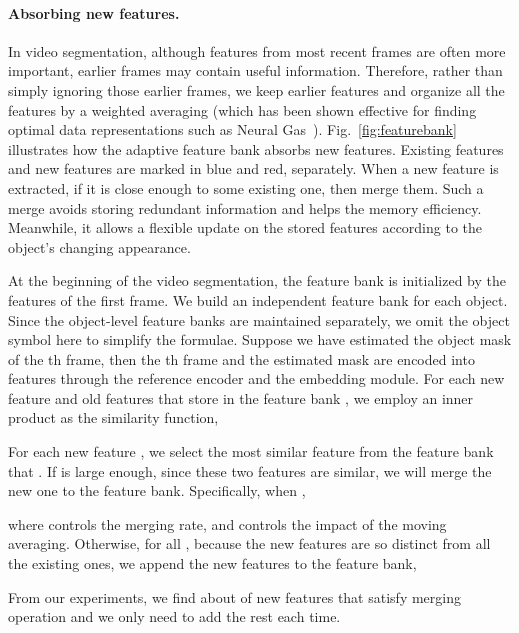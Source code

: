 \documentclass{article}
\begin{document}
\paragraph{Absorbing new features.}
In video segmentation, although features from most recent frames are often more important, earlier frames may contain useful information. 
Therefore, rather than simply ignoring those earlier frames, we keep earlier features and organize all the features by a weighted averaging (which has been shown effective for finding optimal data representations such as Neural Gas~\cite{fritzke1995growing}).
Fig.~\ref{fig:featurebank} illustrates how the adaptive feature bank absorbs new features.
Existing features and new features are marked in blue and red, separately.
When a new feature is extracted, if it is close enough to some existing one, then merge them. 
Such a merge avoids storing redundant information and helps the memory efficiency. 
Meanwhile, it allows a flexible update on the stored features according to the object's changing appearance. 

At the beginning of the video segmentation, the feature bank is initialized by the features of the first frame.
We build an independent feature bank for each object.
Since the object-level feature banks are maintained separately, we omit the object symbol here to simplify the formulae.
Suppose we have estimated the object mask of the th frame, then the th frame and the estimated mask are encoded into features  through the reference encoder and the embedding module.
For each new feature  and old features that store in the feature bank , we employ an inner product as the similarity function,


For each new feature , we select the most similar feature  from the feature bank that .
If  is large enough, since these two features are similar, we will merge the new one to the feature bank.
Specifically, when , 

where  controls the merging rate, and  controls the impact of the moving averaging.
Otherwise, for all , because the new features are so distinct from all the existing ones, we append the new features to the feature bank,

From our experiments, we find about  of new features that satisfy merging operation and we only need to add the rest  each time.
\end{document}
